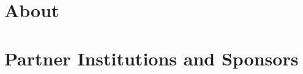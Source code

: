 \documentclass[openany, parskip=full, 12pt, a4]{scrbook}
\begin{document}
	
	

\tableofcontents{}

\chapter{About}



\chapter{Partner Institutions and Sponsors}



\newpage


% 
\end{document}

